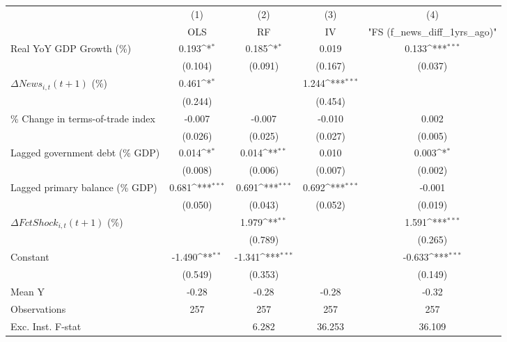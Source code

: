 {
\def\sym#1{\ifmmode^{#1}\else\(^{#1}\)\fi}
\begin{tabular}{l*{4}{c}}
\toprule
                    &\multicolumn{1}{c}{(1)}&\multicolumn{1}{c}{(2)}&\multicolumn{1}{c}{(3)}&\multicolumn{1}{c}{(4)}\\
                    &\multicolumn{1}{c}{OLS}&\multicolumn{1}{c}{RF}&\multicolumn{1}{c}{IV}&\multicolumn{1}{c}{ "FS (f_news_diff_1yrs_ago)" }\\
\midrule
Real YoY GDP Growth (\%)&       0.193\sym{*}  &       0.185\sym{*}  &       0.019         &       0.133\sym{***}\\
                    &     (0.104)         &     (0.091)         &     (0.167)         &     (0.037)         \\
\addlinespace
$ \Delta News_{i,t}(t+1)$ (\%)&       0.461\sym{*}  &                     &       1.244\sym{***}&                     \\
                    &     (0.244)         &                     &     (0.454)         &                     \\
\addlinespace
\% Change in terms-of-trade index&      -0.007         &      -0.007         &      -0.010         &       0.002         \\
                    &     (0.026)         &     (0.025)         &     (0.027)         &     (0.005)         \\
\addlinespace
Lagged government debt (\% GDP)&       0.014\sym{*}  &       0.014\sym{**} &       0.010         &       0.003\sym{*}  \\
                    &     (0.008)         &     (0.006)         &     (0.007)         &     (0.002)         \\
\addlinespace
Lagged primary balance (\% GDP)&       0.681\sym{***}&       0.691\sym{***}&       0.692\sym{***}&      -0.001         \\
                    &     (0.050)         &     (0.043)         &     (0.052)         &     (0.019)         \\
\addlinespace
$ \Delta FctShock_{i,t}(t+1)$ (\%)&                     &       1.979\sym{**} &                     &       1.591\sym{***}\\
                    &                     &     (0.789)         &                     &     (0.265)         \\
\addlinespace
Constant            &      -1.490\sym{**} &      -1.341\sym{***}&                     &      -0.633\sym{***}\\
                    &     (0.549)         &     (0.353)         &                     &     (0.149)         \\
\midrule
Mean Y              &       -0.28         &       -0.28         &       -0.28         &       -0.32         \\
Observations        &         257         &         257         &         257         &         257         \\
Exc. Inst. F-stat   &                     &       6.282         &      36.253         &      36.109         \\
\bottomrule
\end{tabular}
}
